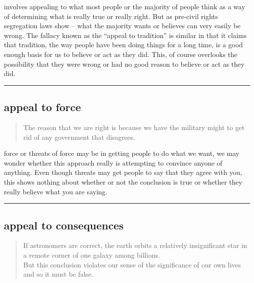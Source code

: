 \documentclass[justified]{tufte-book}
\newenvironment{argument}{\begin{quote}\normalsize}{\end{quote}}
\begin{document}
 involves appealing to what most people or the majority of people think as a way of determining what is really true or really right. But as pre-civil rights segregation laws show -- what the majority wants or believes can very easily be wrong. The fallacy known as the ``appeal to tradition'' is similar in that it claims that tradition, the way people have been doing things for a long time, is a good enough basis for us to believe or act as they did. This, of course overlooks the possibility that they were wrong or had no good reason to believe or act as they did.

\begin{center}\rule{0.5\linewidth}{\linethickness}\end{center}

\hypertarget{appeal-to-force}{%
\subsection*{appeal to force}\label{appeal-to-force}}

\begin{argument}
The reason that we are right is because we have the military might to
get rid of any government that disagrees.
\end{argument}

 force or threats of force may be in getting people to do what we want, we may wonder whether this approach really is attempting to convince anyone of anything. Even though threats may get people to say that they agree with you, this shows nothing about whether or not the conclusion is true or whether they really believe what you are saying.

\begin{center}\rule{0.5\linewidth}{\linethickness}\end{center}

\hypertarget{appeal-to-consequences}{%
\subsection*{appeal to consequences}\label{appeal-to-consequences}}

\begin{argument}
If astronomers are correct, the earth orbits a relatively insignificant
star in a remote corner of one galaxy among billions.\\
But this conclusion violates our sense of the significance of our own
lives and so it must be false.
\end{argument}
\end{document}
